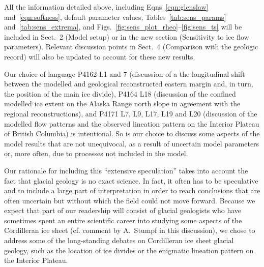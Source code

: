 \clearpage  %

All the information detailed above, including
Eqns~\ref{eqn:glenslaw} and~\ref{eqn:softness}, default parameter values,
Tables~\ref{tab:sens_params} and~\ref{tab:sens_extrema}, and
Figs.~\ref{fig:sens_plot_rheo}--\ref{fig:sens_ts} will be included in Sect.~2
(Model setup) or in the new section (Sensitivity to ice flow parameters).
Relevant discussion points in Sect.~4 (Comparison with the geologic record)
will also be updated to account for these new results.


Our choice of language P4162 L1 and 7 (discussion of a the longitudinal shift
between the modelled and geological reconstructed eastern margin and, in turn,
the position of the main ice divide), P4164 L18 (discussion of the confined
modelled ice extent on the Alaska Range north slope in agreement with the
regional reconstructions), and P4171
L7, L9, L17, L19 and L20 (discussion of the modelled flow patterns and the
observed lineation pattern on the Interior Plateau of British Columbia) is
intentional. So is our choice to discuss some aspects of the model results that
are not unequivocal, as a result of uncertain model parameters or, more often,
due to processes not included in the model.

Our rationale for including this ``extensive speculation'' takes into account
the fact that glacial geology is no exact science. In fact, it often has to be
speculative and to include a large part of interpretation in order to reach
conclusions that are often uncertain but without which the field could not move
forward. Because we expect that part of our readership will consist of glacial
geologists who have sometimes spent an entire scientific career into studying
some aspects of the Cordilleran ice sheet (cf. comment by A.~Stumpf in this
discussion), we chose to address some of the long-standing debates on
Cordilleran ice sheet glacial geology, such as the location of ice divides or
the enigmatic lineation pattern on the Interior Plateau.

